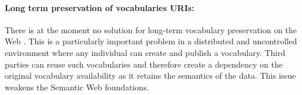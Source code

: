 \documentclass{iosart2c}
\begin{document}
\paragraph{Long term preservation of vocabularies URIs:} There is at the moment no solution for long-term vocabulary preservation on the Web \cite{Baker2013HLT}. This is a particularly important problem in a distributed and uncontrolled environment where any individual can create and publish a vocabulary. Third parties can reuse such vocabularies and therefore create a dependency on the original vocabulary availability as it retains the semantics of the data. This issue weakens the Semantic Web foundations.





\end{document}

